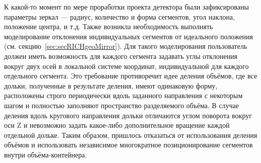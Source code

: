 \bigskip

К какой-то момент по мере проработки проекта детектора были зафиксированы параметры зеркал --- радиус, количество и форма сегментов, угол наклона, положение центра, и т.д. Также возникла необходимость выполнять моделирование отклонения индивидуальных сегментов от идеального положения (см. секцию~\ref{sec:secRICHgeoMirror}). Для такого моделирования пользователь должен иметь возможность для каждого сегмента задавать углы отклонения вокруг двух осей в локальной системе координат, индивидуальной для каждого отдельного сегмента. Это требование противоречит идее деления объёмов, где все дольки, полученные в результате деления, имеют одинаковую форму, расположены строго периодически вдоль заданного направления с некоторым шагом и полностью заполняют пространство разделяемого объёма. В случае деления вдоль кругового направления дольки отличаются углом поворота вокруг оси Z и невозможно  задать какое-либо дополнительное вращение каждой отдельной дольке. Таким образом, пришлось отказаться от использования деления объёмов и использовать независимое многократное позиционирование сегментов внутри объёма-контейнера.
